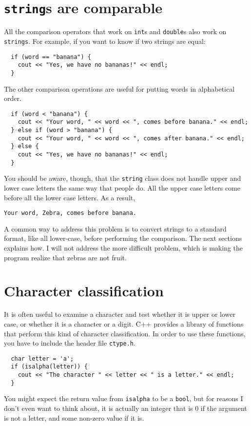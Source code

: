 \section{{\tt string}s are comparable}
\label{incomparable}

All the comparison operators that work on {\tt int}s and
{\tt double}s also work on {\tt strings}.  For example,
if you want to know if two strings are equal:

\begin{verbatim}
  if (word == "banana") {
    cout << "Yes, we have no bananas!" << endl;
  }
\end{verbatim}
%
The other comparison operations are useful for putting words
in alphabetical order.

\begin{verbatim}
  if (word < "banana") {
    cout << "Your word, " << word << ", comes before banana." << endl;
  } else if (word > "banana") {
    cout << "Your word, " << word << ", comes after banana." << endl;
  } else {
    cout << "Yes, we have no bananas!" << endl;
  }
\end{verbatim}
%
You should be aware, though, that the {\tt string} class does
not handle upper and lower case letters the same way that people
do.  All the upper case letters come before all the lower case
letters.  As a result,

\begin{verbatim}
Your word, Zebra, comes before banana.
\end{verbatim}
%
A common way to address this problem is to convert strings to a
standard format, like all lower-case, before performing the
comparison.  The next sections explains how.  I will not address the
more difficult problem, which is making the program realize that
zebras are not fruit.

\section{Character classification}

It is often useful to examine a character and test whether
it is upper or lower case, or whether it is a character or
a digit.  C++ provides a library of functions that perform
this kind of character classification.  In order to use these
functions, you have to include the header file {\tt ctype.h}.

\begin{verbatim}
  char letter = 'a';
  if (isalpha(letter)) {
    cout << "The character " << letter << " is a letter." << endl;
  }
\end{verbatim}
%
You might expect the return value from {\tt isalpha} to
be a {\tt bool}, but for reasons I don't even want to think
about, it is actually an integer that is
0 if the argument is not a letter, and some non-zero value
if it is.

